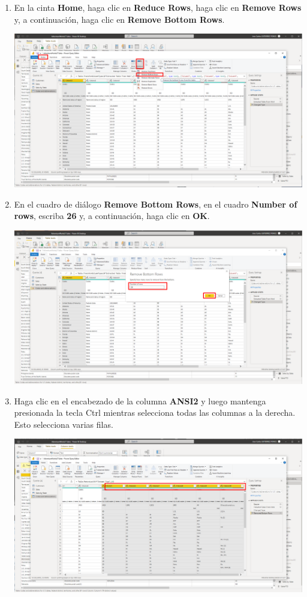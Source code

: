 \documentclass[12pt,letterpaper]{article}
\newcommand\tab[1][1cm]{\hspace*{#1}}
\begin{document}
\begin{enumerate}[\tab 1.]
\begin{center}
        \end{center}
        \item En la cinta \textbf{Home}, haga clic en \textbf{Reduce Rows}, haga clic en \textbf{Remove Rows} y, a continuación, haga clic en \textbf{Remove Bottom Rows}.
        \begin{center}
            \includegraphics[width=13cm]{./img/img59.png}
        \end{center}
        \item En el cuadro de diálogo \textbf{Remove Bottom Rows}, en el cuadro \textbf{Number of rows}, escriba \textbf{26} y, a continuación, haga clic en \textbf{OK}.
        \begin{center}
            \includegraphics[width=13cm]{./img/img60.png}
        \end{center}
        \item Haga clic en el encabezado de la columna \textbf{ANSI2} y luego mantenga presionada la tecla Ctrl mientras selecciona todas las columnas a la derecha. Esto selecciona varias filas.
        \begin{center}
            \includegraphics[width=13cm]{./img/img61.png}

\end{center}
\end{enumerate}
\end{document}
